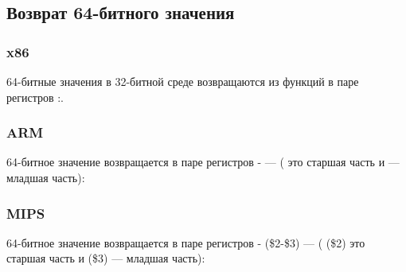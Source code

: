 ﻿\subsection{Возврат 64-битного значения}



\subsubsection{x86}

64-битные значения в 32-битной среде возвращаются из функций в паре регистров \EDX{}:\EAX{}.



\subsubsection{ARM}

64-битное значение возвращается в паре регистров - --- ( это старшая часть и  --- младшая часть):



\subsubsection{MIPS}

64-битное значение возвращается в паре регистров - (\$2-\$3) --- ( (\$2) это старшая часть и  (\$3) --- младшая часть):





